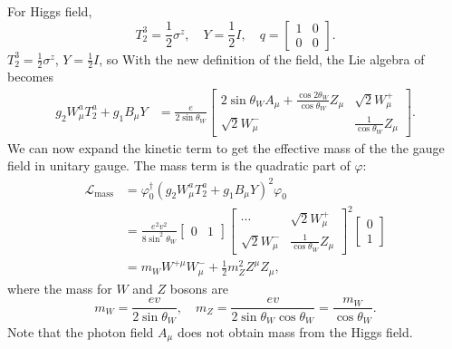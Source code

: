 \documentclass[aps,prb,superscriptaddress,nofootinbib]{revtex4}
\begin{document}
For Higgs field, 
\begin{equation}
	T^3_2 = \frac{1}{2}\sigma^z, \quad
	Y = \frac{1}{2} I,\quad 
	q = \begin{bmatrix}
		1 & 0 \\ 0 & 0
	\end{bmatrix}.
\end{equation}
$T^3_2 = \frac{1}{2}\sigma^z$, $Y=\frac{1}{2}I$, so 
With the new definition of the field, the Lie algebra of becomes
\begin{equation}
\begin{aligned}
	g_2 W^a_\mu T_2^a + g_1 B_\mu Y 
	&= \frac{e}{2 \sin{\theta_W}} 
	\begin{bmatrix}
		2\sin{\theta_W} A_\mu + \frac{\cos{2\theta_W}}{\cos{\theta_W}} Z_\mu & \sqrt{2} W^+_\mu \\
		\sqrt{2} W_\mu^- & \frac{1}{\cos{\theta_W}} Z_\mu
	\end{bmatrix}.
\end{aligned}
\end{equation}
We can now expand the kinetic term to get the effective mass of the the gauge field in unitary gauge. 
The mass term is the quadratic part of $\varphi$:
\begin{equation}
\begin{aligned}
	\mathcal L_{\mathrm{mass}} 
	&= \varphi_0^\dagger \left(g_2 W^a_\mu T_2^a + g_1 B_\mu Y\right)^2 \varphi_0 \\
	&= \frac{e^2v^2}{8 \sin^2{\theta_W}} 
	\begin{bmatrix}
		0 & 1
	\end{bmatrix} 
	\begin{bmatrix}
		\cdots & \sqrt{2} W^+_\mu \\
		\sqrt{2} W_\mu^- & \frac{1}{\cos{\theta_W}} Z_\mu
	\end{bmatrix}^2
	\begin{bmatrix}
		0 \\ 1
	\end{bmatrix} \\
	&= m_W W^{+\mu} W_\mu^- + \frac{1}{2}m_Z^2 Z^\mu Z_\mu,
\end{aligned}
\end{equation}
where the mass for $W$ and $Z$ bosons are
\begin{equation}
	m_W = \frac{ev}{2 \sin{\theta_W}}, \quad 
	m_Z = \frac{e v}{2\sin{\theta_W}\cos{\theta_W}} = \frac{m_W}{\cos{\theta_W}}.
\end{equation}
Note that the photon field $A_\mu$ does not obtain mass from the Higgs field.
\end{document}
